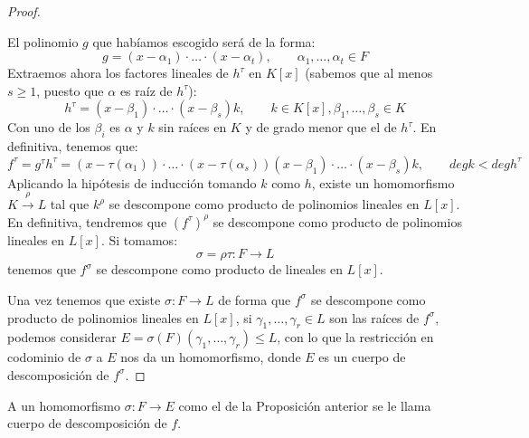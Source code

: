 \begin{prop}
\begin{proof}
\begin{itemize}
                El polinomio $g$ que habíamos escogido será de la forma:
                \begin{equation*}
                    g = (x-\alpha_1)\cdot  \ldots \cdot (x-\alpha_t), \qquad \alpha_1,\ldots,\alpha_t \in F
                \end{equation*}
                Extraemos ahora los factores lineales de $h^\tau$ en $K[x]$ (sabemos que al menos $s\geq 1$, puesto que $\alpha$ es raíz de $h^\tau$):
                \begin{equation*}
                    h^\tau = (x-\beta_1)\cdot \ldots\cdot (x-\beta_s)k, \qquad k\in K[x], \beta_1,\ldots,\beta_s\in K
                \end{equation*}
                Con uno de los $\beta_i$ es $\alpha$ y $k$ sin raíces en $K$ y de grado menor que el de $h^\tau$. En definitiva, tenemos que:
                \begin{equation*}
                    f^\tau = g^\tau h^\tau = (x-\tau(\alpha_1))\cdot  \ldots \cdot (x-\tau(\alpha_s))(x-\beta_1) \cdot \ldots \cdot (x-\beta_s)k, \qquad deg k < deg h^\tau
                \end{equation*}
                Aplicando la hipótesis de inducción tomando $k$ como $h$, existe un homomorfismo $K\stackrel{\rho}{\to}L$ tal que $k^\rho$  se descompone como producto de polinomios lineales en $L[x]$. En definitiva, tendremos que ${(f^\tau)}^{\rho}$ se descompone como producto de polinomios lineales en $L[x]$. Si tomamos:
                \begin{equation*}
                    \sigma = \rho\tau : F\to L
                \end{equation*}
                tenemos que $f^\sigma$ se descompone como producto de lineales en $L[x]$.
        \end{itemize}
        Una vez tenemos que existe $\sigma:F\to L$ de forma que $f^\sigma$ se descompone como producto de polinomios lineales en $L[x]$, si $\gamma_1,\ldots,\gamma_r\in L$ son las raíces de $f^\sigma$, podemos considerar $E=\sigma(F)(\gamma_1,\ldots,\gamma_r)\leq L$, con lo que la restricción en codominio de $\sigma$ a $E$ nos da un homomorfismo, donde $E$ es un cuerpo de descomposición de $f^\sigma$.
    \end{proof}
\end{prop}

\begin{definicion}
    A un homomorfismo $\sigma:F\to E$ como el de la Proposición anterior se le llama cuerpo de descomposición de $f$.
\end{definicion}

